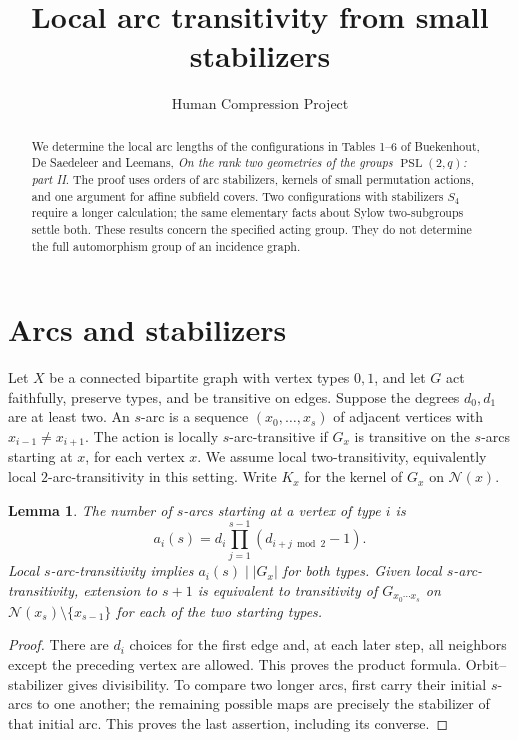 \documentclass[11pt]{article}
\title{Local arc transitivity from small stabilizers}
\author{Human Compression Project}
\date{}
\newtheorem{lemma}{Lemma}
\newcommand{\PSL}{\operatorname{PSL}}
\newcommand{\N}{\mathcal N}
\begin{document}
\maketitle
\begin{abstract}
We determine the local arc lengths of the configurations in Tables 1--6
of Buekenhout, De Saedeleer and Leemans, \emph{On the rank two geometries
of the groups $\PSL(2,q)$: part II}. The proof uses orders of arc
stabilizers, kernels of small permutation actions, and one argument for
affine subfield covers. Two configurations with stabilizers $S_4$ require
a longer calculation; the same elementary facts about Sylow two-subgroups
settle both. These results concern the specified acting group. They do not
determine the full automorphism group of an incidence graph.
\end{abstract}

\section{Arcs and stabilizers}
Let $X$ be a connected bipartite graph with vertex types $0,1$, and let
$G$ act faithfully, preserve types, and be transitive on edges. Suppose
the degrees $d_0,d_1$ are at least two. An $s$-arc is a sequence
$(x_0,\ldots,x_s)$ of adjacent vertices with $x_{i-1}\ne x_{i+1}$.
The action is locally $s$-arc-transitive if $G_x$ is transitive on the
$s$-arcs starting at $x$, for each vertex $x$. We assume local
two-transitivity, equivalently local $2$-arc-transitivity in this setting.
Write $K_x$ for the kernel of $G_x$ on $\N(x)$.

\begin{lemma}\label{count}
The number of $s$-arcs starting at a vertex of type $i$ is
\[
 a_i(s)=d_i\prod_{j=1}^{s-1}(d_{i+j\bmod2}-1).
\]
Local $s$-arc-transitivity implies $a_i(s)\mid |G_x|$ for both types.
Given local $s$-arc-transitivity, extension to $s+1$ is equivalent to
transitivity of $G_{x_0\cdots x_s}$ on
$\N(x_s)\setminus\{x_{s-1}\}$ for each of the two starting types.
\end{lemma}
\begin{proof}
There are $d_i$ choices for the first edge and, at each later step, all
neighbors except the preceding vertex are allowed. This proves the product
formula. Orbit--stabilizer gives divisibility. To compare two longer arcs,
first carry their initial $s$-arcs to one another; the remaining possible
maps are precisely the stabilizer of that initial arc. This proves the
last assertion, including its converse.
\end{proof}
\end{document}
